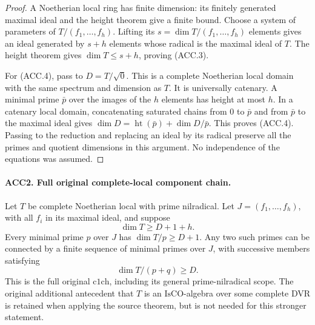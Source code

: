 \begin{proof}
A Noetherian local ring has finite dimension: its finitely generated
maximal ideal and the height theorem give a finite bound.  Choose a
system of parameters of \(T/(f_1,\ldots,f_h)\).  Lifting its
\(s=\dim T/(f_1,\ldots,f_h)\) elements gives an ideal generated by
\(s+h\) elements whose radical is the maximal ideal of \(T\).
The height theorem gives \(\dim T\le s+h\), proving (ACC.3).

For (ACC.4), pass to \(D=T/\sqrt{0}\).  This is a complete
Noetherian local domain with the same spectrum and dimension as
\(T\).  It is universally catenary.  A minimal prime \(\bar p\)
over the images of the \(h\) elements has height at most \(h\).
In a catenary local domain, concatenating saturated chains from
\(0\) to \(\bar p\) and from \(\bar p\) to the maximal ideal
gives
\(\dim D=\operatorname{ht}(\bar p)+\dim D/\bar p\).
This proves (ACC.4).  Passing to the reduction and replacing an
ideal by its radical preserve all the primes and quotient dimensions
in this argument.  No independence of the equations was assumed.
\end{proof}

\paragraph{ACC2. Full original complete-local component chain.}
\label{claim:ACC2}
Let \(T\) be complete Noetherian local with prime nilradical.
Let \(J=(f_1,\ldots,f_h)\), with all \(f_i\) in its maximal
ideal, and suppose
\[
                          \dim T\ge D+1+h.                \tag{ACC.5}
\]
Every minimal prime \(p\) over \(J\) has \(\dim T/p\ge D+1\).
Any two such primes can be connected by a finite sequence of minimal
primes over \(J\), with successive members satisfying
\[
                          \dim T/(p+q)\ge D.              \tag{ACC.6}
\]
This is the full original \(\mathrm{c1ch}\), including its general
prime-nilradical scope.  The original additional antecedent that
\(T\) is an \(\mathrm{IsCO}\)-algebra over some complete DVR is
retained when applying the source theorem, but is not needed for
this stronger statement.

